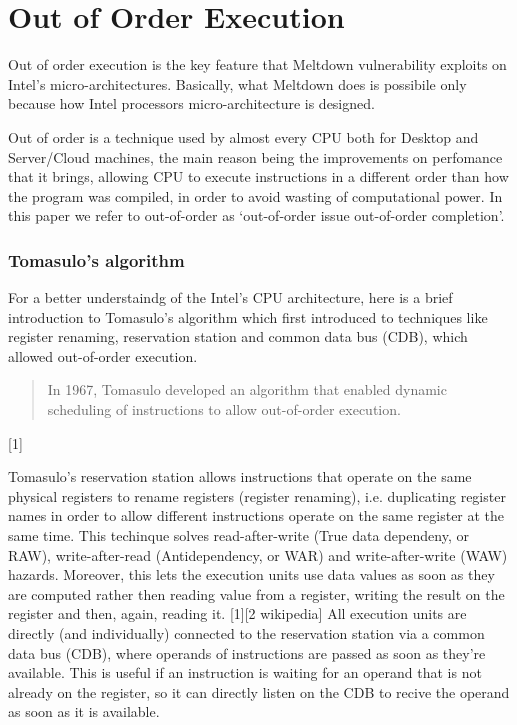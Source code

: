 \section{Out of Order Execution}
Out of order execution is the key feature that Meltdown vulnerability exploits on Intel's micro-architectures. Basically, what
Meltdown does is possibile only because how Intel processors micro-architecture is designed.

Out of order is a technique used by almost every CPU both for Desktop and Server/Cloud machines, the main reason being the improvements on perfomance that it brings, allowing
CPU to execute instructions in a different order than how the program was compiled, in order to avoid wasting of computational power.
In this paper we refer to out-of-order as `out-of-order issue out-of-order completion'.

\subsubsection{Tomasulo's algorithm}
For a better understaindg of the Intel's CPU architecture, here is a brief introduction to Tomasulo's algorithm which
first introduced to techniques like register renaming, reservation station and common data bus (CDB), which allowed
out-of-order execution.

\begin{quote}
    In 1967, Tomasulo developed an algorithm that
    enabled dynamic scheduling of instructions to allow
    out-of-order execution.
\end{quote} [1]

Tomasulo's reservation station allows instructions that operate on the same physical registers to rename registers (register renaming), i.e. duplicating
register names in order to allow different instructions operate on the same register at the same time. This techinque solves read-after-write (True data dependeny, or RAW),
write-after-read (Antidependency, or WAR) and write-after-write (WAW) hazards.
Moreover, this lets the execution units use data values as soon as they are computed rather then reading value from a register,
writing the result on the register and then, again, reading it. [1][2 wikipedia]
All execution units are directly (and individually) connected to the reservation station via a common data bus (CDB), where operands of instructions are
passed as soon as they're available. This is useful if an instruction is waiting for an operand that is not already on the register, so it can directly listen
on the CDB to recive the operand as soon as it is available.

